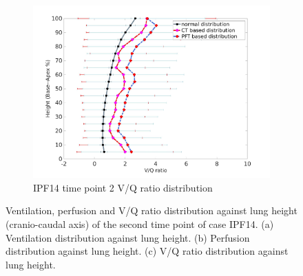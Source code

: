 \begin{figure}[htbp]
\begin{subfigure}{.6\linewidth}
  \includegraphics[width=\linewidth,trim={{.0\wd0} {.0\wd0} {.0\wd0} {.0\wd0}},clip]{Appendix/Image_AppexB/IPF1402/IPF1402_VQAgainstLungHeight.png}
  \caption{IPF14 time point 2 V/Q ratio distribution}
  \label{fig:IPF1402VQDistribution-c}
\end{subfigure}
\caption{ Ventilation, perfusion and V/Q ratio distribution against lung height (cranio-caudal axis) of the second time point of case IPF14. (a) Ventilation distribution against lung height. (b) Perfusion distribution against lung height. (c) V/Q ratio distribution against lung height.}
\label{fig:IPF1402VQDistribution}
\end{figure}